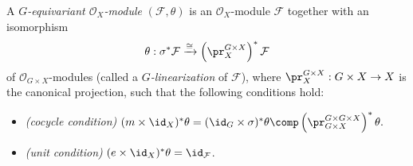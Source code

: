 \begin{defn}\label{defn:EquivariantSheaves}
A \emph{$G$-equivariant $\mathcal{O}_X$-module}
$(\mathcal{F}, \theta)$
is an $\mathcal{O}_X$-module $\mathcal{F}$
together with an isomorphism
$$
\theta : \sigma^* \mathcal{F} \xrightarrow{\cong} \left(\pr_X^{G \times X}\right)^* \mathcal{F}
$$
of $\mathcal{O}_{G\times X}$-modules
(called a \emph{$G$-linearization} of $\mathcal{F}$),
where $\pr_X^{G \times X} : G \times X \rightarrow X$ is the canonical projection,
such that the following conditions hold:
\begin{itemize}
\item \emph{(cocycle condition)}
$
(m \times \id_X)^* \theta
=
(\id_G \times \sigma)^* \theta \comp \left(\pr_{G \times X}^{G \times G \times X}\right)^* \theta.
$

\item \emph{(unit condition)}
$(e \times \id_X)^*\theta = \id_{\mathcal{F}}$.

\end{itemize}


\end{defn}
